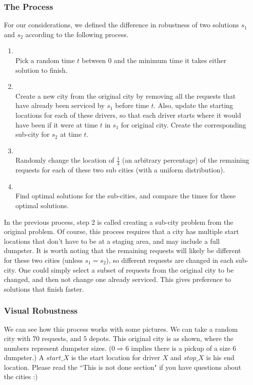 \documentclass{article}
\begin{document}
\subsubsection{The Process}


For our considerations, we defined the difference in robustness of two solutions $s_1$ and $s_2$ according to the following process.

\begin{enumerate}
\item \hfill \\ Pick a random time $t$ between $0$ and the minimum time it takes either solution to finish.
\item \hfill \\  Create a new city from the original city by removing all the requests that have already been serviced by $s_1$ before time $t$.
Also, update the starting locations for each of these drivers, so that each driver starts where it would have been if it were at time $t$ in $s_1$ for original city.
Create the corresponding sub-city for $s_2$ at time $t$.
\item \hfill \\  Randomly change the location of $\frac 1 4$ (an arbitrary percentage) of the remaining requests for each of these two sub cities (with a uniform distribution).
\item \hfill \\  Find optimal solutions for the sub-cities, and compare the times for these optimal solutions.
\end{enumerate}

In the previous process, step 2 is called creating a sub-city problem from the original problem.
Of course, this process requires that a city has multiple start locations that don't have to be at a staging area, and may include a full dumpster.
It is worth noting that the remaining requests will likely be different for these two cities (unless $s_1 = s_2$), so different requests are changed in each sub-city.
One could simply select a subset of requests from the original city to be changed, and then not change one already serviced.
This gives preference to solutions that finish faster.

\subsubsection{Visual Robustness}
We can see how this process works with some pictures.
We can take a random city with $70$ requests, and $5$ depots.
This original city is as shown, where the numbers represent dumpster sizes.
($0\Rightarrow 6$ implies there is a pickup of a size $6$ dumpster.)
A $start\_X$ is the start location for driver $X$ and $stop\_X$ is his end location.
Please read the ``This is not done section" if you have questions about the cities :)
\end{document}
